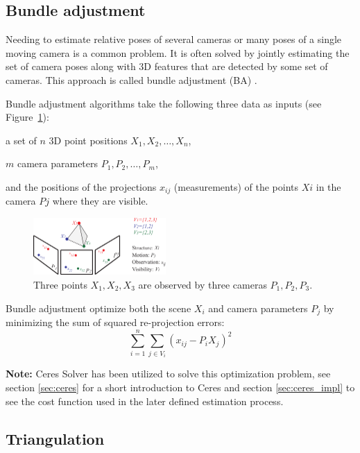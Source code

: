 \subsection{Bundle adjustment}
\label{sec:BA}

Needing to estimate relative poses of several cameras or many poses of a single moving camera is a common problem. It is often solved by jointly estimating the set of camera poses along with 3D features that are detected by some set of cameras. This approach is called bundle adjustment (BA) \cite{BA}.

Bundle adjustment algorithms take the following three data as inputs (see Figure~\ref{fig:BA}):
\begin{itemize*}
 \item a set of $n$ 3D point positions $X_1, X_2, \dots, X_n$,
 \item $m$ camera parameters $P_1, P_2, \dots, P_m$,
 \item and the positions of the projections $x_{ij}$ (measurements) of the points $Xi$ in the camera $Pj$ where they are visible.
\end{itemize*}

\begin{figure}[!htbp]
 \centering
 \includegraphics[width=0.45\textwidth]{images/BA.pdf}
 \caption{Three points $X_1, X_2, X_3$ are observed by three cameras $P_1, P_2, P_3$.}
 \label{fig:BA}
\end{figure}

\noindent
Bundle adjustment optimize both the scene $X_i$ and camera parameters $P_j$ by minimizing the sum of squared re-projection errors:
\[
 \sum _{i=1}^{n}\sum _{j\in V_{i}}\left( x_{ij}-P_{i}X_{j}\right)^2
\]

\noindent
\textbf{Note:} Ceres Solver has been utilized to solve this optimization problem, see section \ref{sec:ceres} for a short introduction to Ceres and section \ref{sec:ceres_impl} to see the cost function used in the later defined estimation process.


\subsection{Triangulation}
\label{sec:triangulation}

